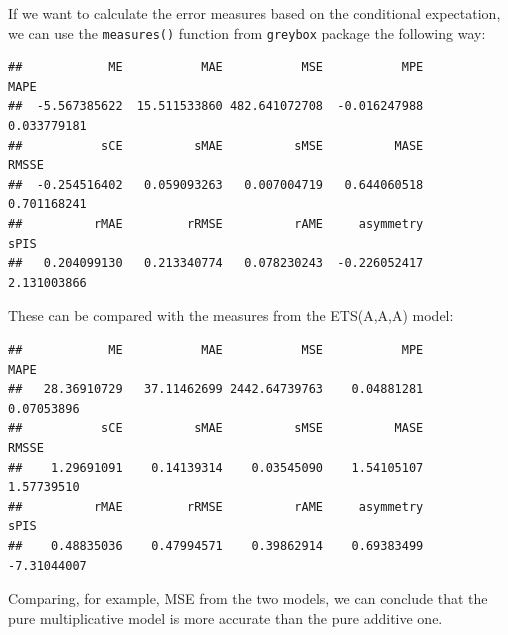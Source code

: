\documentclass[
]{book}
\newenvironment{Shaded}{\begin{snugshade}}{\end{snugshade}}
\newcommand{\FunctionTok}[1]{\textcolor[rgb]{0.00,0.00,0.00}{#1}}
\newcommand{\NormalTok}[1]{#1}
\newcommand{\SpecialCharTok}[1]{\textcolor[rgb]{0.00,0.00,0.00}{#1}}
\theoremstyle{definition}
\theoremstyle{definition}
\theoremstyle{definition}
\theoremstyle{definition}
\theoremstyle{remark}
\begin{document}
If we want to calculate the error measures based on the conditional expectation, we can use the \texttt{measures()} function from \texttt{greybox} package the following way:

\begin{Shaded}
\end{Shaded}

\begin{verbatim}
##            ME           MAE           MSE           MPE          MAPE 
##  -5.567385622  15.511533860 482.641072708  -0.016247988   0.033779181 
##           sCE          sMAE          sMSE          MASE         RMSSE 
##  -0.254516402   0.059093263   0.007004719   0.644060518   0.701168241 
##          rMAE         rRMSE          rAME     asymmetry          sPIS 
##   0.204099130   0.213340774   0.078230243  -0.226052417   2.131003866
\end{verbatim}

These can be compared with the measures from the ETS(A,A,A) model:

\begin{Shaded}
\end{Shaded}

\begin{verbatim}
##            ME           MAE           MSE           MPE          MAPE 
##   28.36910729   37.11462699 2442.64739763    0.04881281    0.07053896 
##           sCE          sMAE          sMSE          MASE         RMSSE 
##    1.29691091    0.14139314    0.03545090    1.54105107    1.57739510 
##          rMAE         rRMSE          rAME     asymmetry          sPIS 
##    0.48835036    0.47994571    0.39862914    0.69383499   -7.31044007
\end{verbatim}

Comparing, for example, MSE from the two models, we can conclude that the pure multiplicative model is more accurate than the pure additive one.
\end{document}
